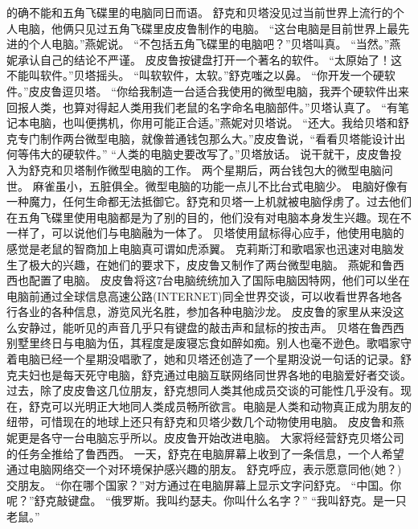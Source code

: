\documentclass[a4paper,12pt,UTF8,twoside]{ctexbook}
\begin{document}
        的确不能和五角飞碟里的电脑同日而语。  
        舒克和贝塔没见过当前世界上流行的个人电脑，他俩只见过五角飞碟里皮皮鲁制作的电脑。  
        “这台电脑是目前世界上最先进的个人电脑。”燕妮说。        
        “不包括五角飞碟里的电脑吧？”贝塔叫真。  
        “当然。”燕妮承认自己的结论不严谨。  
        皮皮鲁按键盘打开一个著名的软件。  
        “太原始了！这不能叫软件。”贝塔摇头。  
        “叫软软件，太软。”舒克嗤之以鼻。  
        “你开发一个硬软件。”皮皮鲁逗贝塔。  
        “你给我制造一台适合我使用的微型电脑，我弄个硬软件出来回报人类，也算对得起人类用我们老鼠的名字命名电脑部件。”贝塔认真了。  
        “有笔记本电脑，也叫便携机，你用可能正合适。”燕妮对贝塔说。  
        “还大。我给贝塔和舒克专门制作两台微型电脑，就像普通钱包那么大。”皮皮鲁说，“看看贝塔能设计出何等伟大的硬软件。”  
        “人类的电脑史要改写了。”贝塔放话。  
        说干就干，皮皮鲁投入为舒克和贝塔制作微型电脑的工作。  
        两个星期后，两台钱包大的微型电脑问世。  
        麻雀虽小，五脏俱全。微型电脑的功能一点儿不比台式电脑少。  
        电脑好像有一种魔力，任何生命都无法抵御它。舒克和贝塔一上机就被电脑俘虏了。过去他们在五角飞碟里使用电脑都是为了别的目的，他们没有对电脑本身发生兴趣。现在不一样了，可以说他们与电脑融为一体了。  
        贝塔使用鼠标得心应手，他使用电脑的感觉是老鼠的智商加上电脑真可谓如虎添翼。  
        克莉斯汀和歌唱家也迅速对电脑发生了极大的兴趣，在她们的要求下，皮皮鲁又制作了两台微型电脑。  
        燕妮和鲁西西也配置了电脑。  
        皮皮鲁将这7台电脑统统加入了国际电脑因特网，他们可以坐在电脑前通过全球信息高速公路(INTERNET)同全世界交谈，可以收看世界各地各行各业的各种信息，游览风光名胜，参加各种电脑沙龙。  
        皮皮鲁的家里从来没这么安静过，能听见的声音几乎只有键盘的敲击声和鼠标的按击声。  
        贝塔在鲁西西别墅里终日与电脑为伍，其程度是废寝忘食如醉如痴。别人也毫不逊色。歌唱家守着电脑已经一个星期没唱歌了，她和贝塔还创造了一个星期没说一句话的记录。舒克夫妇也是每天死守电脑，舒克通过电脑互联网络同世界各地的电脑爱好者交谈。过去，除了皮皮鲁这几位朋友，舒克想同人类其他成员交谈的可能性几乎没有。现在，舒克可以光明正大地同人类成员畅所欲言。电脑是人类和动物真正成为朋友的纽带，可惜现在的地球上还只有舒克和贝塔少数几个动物使用电脑。        
        皮皮鲁和燕妮更是各守一台电脑忘乎所以。皮皮鲁开始改进电脑。  
        大家将经营舒克贝塔公司的任务全推给了鲁西西。  
        一天，舒克在电脑屏幕上收到了一条信息，一个人希望通过电脑网络交一个对环境保护感兴趣的朋友。  
        舒克呼应，表示愿意同他(她？)交朋友。  
        “你在哪个国家？”对方通过在电脑屏幕上显示文字问舒克。  
        “中国。你呢？”舒克敲键盘。  
        “俄罗斯。我叫约瑟夫。你叫什么名字？”  
        “我叫舒克。是一只老鼠。”  
\end{document}
